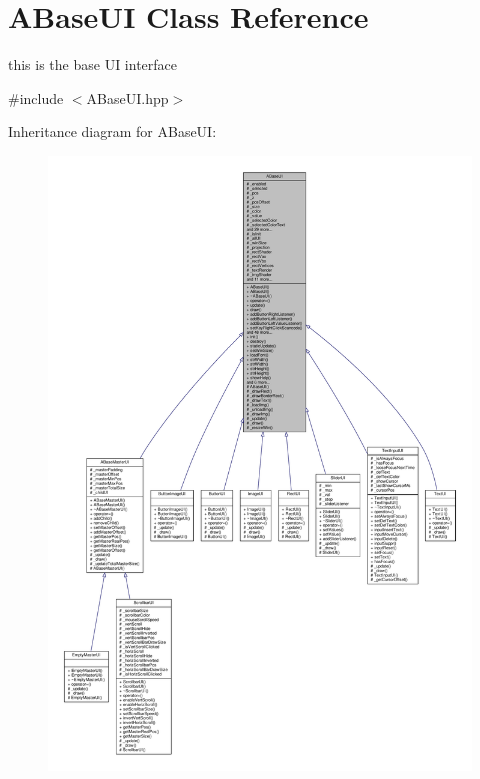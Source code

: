 \hypertarget{class_a_base_u_i}{}\section{A\+Base\+UI Class Reference}
\label{class_a_base_u_i}


this is the base UI interface  




{\ttfamily \#include $<$A\+Base\+U\+I.\+hpp$>$}



Inheritance diagram for A\+Base\+UI\+:
\nopagebreak
\begin{figure}[H]
\begin{center}
\leavevmode
\includegraphics[width=350pt]{class_a_base_u_i__inherit__graph}
\end{center}
\end{figure}


